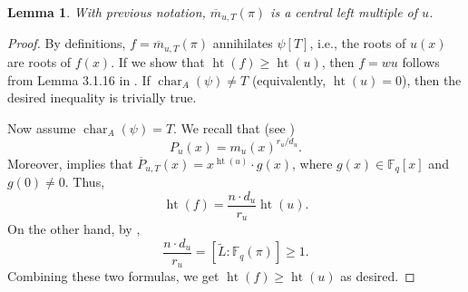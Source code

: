 \documentclass[12pt]{amsart}
\newtheorem{lem}[thm]{Lemma}
\theoremstyle{definition}
\theoremstyle{remark}
\numberwithin{equation}{section}
\numberwithin{thm}{section}
\DeclareMathOperator{\Ht}{ht}
\DeclareMathOperator{\chr}{char}
\newcommand{\F}{\mathbb{F}}
\begin{document}
\begin{lem}\label{lemCLM}
	With previous notation, $\overline{m}_{u, T}(\pi)$ is a central left multiple of $u$. 
\end{lem} 
\begin{proof}
	By definitions, $f=\overline{m}_{u, T}(\pi)$ annihilates $\psi[T]$, i.e., the roots of $u(x)$ are roots of $f(x)$.   If we show 
	that $\Ht(f)\geq \Ht(u)$, then $f=wu$ follows from Lemma 3.1.16 in \cite{PapikianGTM}. If 
	$\chr_A(\psi)\neq T$ (equivalently, $\Ht(u)=0$), then the desired inequality is trivially true. 
	
	Now assume $\chr_A(\psi)=T$. We recall that (see \cite[Thm. 4.2.2]{PapikianGTM}) 
	\begin{equation}\label{eqPandM}
		P_u(x)=m_u(x)^{r_u/d_u}. 
		\end{equation} 
	Moreover, \cite[Thm. 4.2.13]{PapikianGTM} implies that 
	$\overline{P}_{u, T}(x)=x^{\Ht(u)}\cdot g(x)$, where $g(x)\in \F_q[x]$ and $g(0)\neq 0$. Thus, 
	$$
	\Ht(f)=\frac{n\cdot d_u}{r_u}\Ht(u). 
	$$
	On the other hand, by  \cite[(4.1.3)]{PapikianGTM}, 
	$$
	\frac{n\cdot d_u}{r_u} = [\widetilde{L}:\F_q(\pi)]\geq 1. 
	$$
	Combining these two formulas, we get $\Ht(f)\geq \Ht(u)$ as desired. 
\end{proof}
\end{document}
